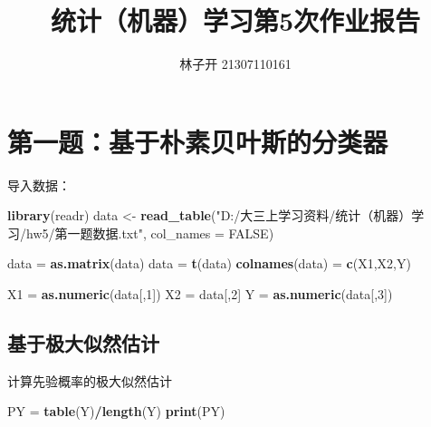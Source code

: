 \documentclass[
]{ctexart}
\title{统计（机器）学习第5次作业报告}
\author{林子开 21307110161}
\date{}
\newenvironment{Shaded}{\begin{snugshade}}{\end{snugshade}}
\newcommand{\AttributeTok}[1]{\textcolor[rgb]{0.13,0.29,0.53}{#1}}
\newcommand{\ConstantTok}[1]{\textcolor[rgb]{0.56,0.35,0.01}{#1}}
\newcommand{\DecValTok}[1]{\textcolor[rgb]{0.00,0.00,0.81}{#1}}
\newcommand{\FunctionTok}[1]{\textcolor[rgb]{0.13,0.29,0.53}{\textbf{#1}}}
\newcommand{\NormalTok}[1]{#1}
\newcommand{\OtherTok}[1]{\textcolor[rgb]{0.56,0.35,0.01}{#1}}
\newcommand{\SpecialCharTok}[1]{\textcolor[rgb]{0.81,0.36,0.00}{\textbf{#1}}}
\newcommand{\StringTok}[1]{\textcolor[rgb]{0.31,0.60,0.02}{#1}}
\begin{document}
\maketitle

{
\setcounter{tocdepth}{2}
\tableofcontents
}
\hypertarget{ux7b2cux4e00ux9898ux57faux4e8eux6734ux7d20ux8d1dux53f6ux65afux7684ux5206ux7c7bux5668}{%
\section{第一题：基于朴素贝叶斯的分类器}\label{ux7b2cux4e00ux9898ux57faux4e8eux6734ux7d20ux8d1dux53f6ux65afux7684ux5206ux7c7bux5668}}

导入数据：

\begin{Shaded}
\begin{Highlighting}[]
\FunctionTok{library}\NormalTok{(readr)}
\NormalTok{data }\OtherTok{\textless{}{-}} \FunctionTok{read\_table}\NormalTok{(}\StringTok{"D:/大三上学习资料/统计（机器）学习/hw5/第一题数据.txt"}\NormalTok{, }\AttributeTok{col\_names =} \ConstantTok{FALSE}\NormalTok{)}

\NormalTok{data }\OtherTok{=} \FunctionTok{as.matrix}\NormalTok{(data)}
\NormalTok{data }\OtherTok{=} \FunctionTok{t}\NormalTok{(data)}
\FunctionTok{colnames}\NormalTok{(data) }\OtherTok{=} \FunctionTok{c}\NormalTok{(}\StringTok{\textquotesingle{}X1\textquotesingle{}}\NormalTok{,}\StringTok{\textquotesingle{}X2\textquotesingle{}}\NormalTok{,}\StringTok{\textquotesingle{}Y\textquotesingle{}}\NormalTok{)}

\NormalTok{X1 }\OtherTok{=} \FunctionTok{as.numeric}\NormalTok{(data[,}\DecValTok{1}\NormalTok{])}
\NormalTok{X2 }\OtherTok{=}\NormalTok{ data[,}\DecValTok{2}\NormalTok{]}
\NormalTok{Y }\OtherTok{=} \FunctionTok{as.numeric}\NormalTok{(data[,}\DecValTok{3}\NormalTok{])}
\end{Highlighting}
\end{Shaded}

\hypertarget{ux57faux4e8eux6781ux5927ux4f3cux7136ux4f30ux8ba1}{%
\subsection{基于极大似然估计}\label{ux57faux4e8eux6781ux5927ux4f3cux7136ux4f30ux8ba1}}

计算先验概率的极大似然估计

\begin{Shaded}
\begin{Highlighting}[]
\NormalTok{PY }\OtherTok{=} \FunctionTok{table}\NormalTok{(Y)}\SpecialCharTok{/}\FunctionTok{length}\NormalTok{(Y)}
\FunctionTok{print}\NormalTok{(PY)}
\end{Highlighting}
\end{Shaded}
\end{document}
